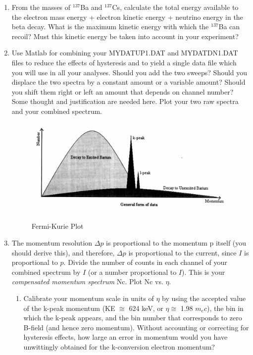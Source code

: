 \documentclass{../lab}
\begin{document}
\begin{enumerate}
    \item From the masses of $^{137}$Ba and $^{137}$Cs, calculate the total energy available to the electron mass energy + electron kinetic energy + neutrino energy in the beta decay. What is the maximum kinetic energy with which the $^{137}$Ba can recoil? Must this kinetic energy be taken into account in your experiment?

    \item Use Matlab for combining your MYDATUP1.DAT and MYDATDN1.DAT files to reduce the effects of hysteresis and to yield a single data file which you will use in all your analyses. Should you add the two sweeps? Should you displace the two spectra by a constant amount or a variable amount? Should you shift them right or left an amount that depends on channel number? Some thought and justification are needed here. Plot your two raw spectra and your combined spectrum.
          
    \begin{figure}[h]
    \centering
        \href{http://experimentationlab.berkeley.edu/sites/default/files/images/BRAimage025.gif}{\includegraphics[width=0.5\linewidth]{images/BRAimage025.png}}
        \caption{Fermi-Kurie Plot}
        \label{fig:FermiKuriePlot}
    \end{figure}

    \item The momentum resolution $\Delta p$ is proportional to the momentum p itself (you should derive this), and therefore, $\Delta p$ is proportional to the current, since $I$ is proportional to $p$. Divide the number of counts in each channel of your combined spectrum by $I$ (or a number proportional to $I$). This is your \emph{compensated momentum spectrum} Nc. Plot Nc vs. $\eta$.

    \begin{enumerate}
        \item Calibrate your momentum scale in units of $\eta$ by using the accepted value of the k-peak momentum (KE $\cong$ 624 keV, or $\eta \cong$ 1.98 $m_e c$), the bin in which the k-peak appears, and the bin number that corresponds to zero B-field (and hence zero momentum). Without accounting or correcting for hysteresis effects, how large an error in momentum would you have unwittingly obtained for the k-conversion electron momentum?


\end{enumerate}
\end{enumerate}
\end{document}
